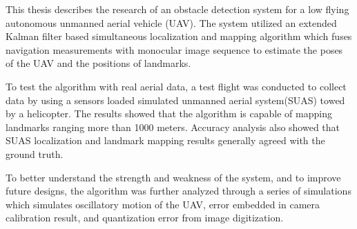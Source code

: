 
This thesis describes the research of an obstacle detection system for a low flying
autonomous unmanned aerial vehicle (UAV). The system utilized an
extended Kalman filter based simultaneous localization and mapping
algorithm which fuses navigation measurements with
monocular image sequence to estimate the poses of the UAV and the positions
of landmarks.

To test the algorithm with real aerial data, a test flight was conducted to
collect data by using a sensors loaded simulated unmanned aerial system(SUAS) towed
by a helicopter. 
The results showed that the algorithm is capable of mapping
landmarks ranging more than 1000 meters. Accuracy analysis also showed that SUAS localization and landmark mapping
results generally agreed with the ground truth. 

To better understand the strength and weakness of
the system, and to improve future designs, the
algorithm was further analyzed through a series of simulations which simulates oscillatory motion of the UAV, error embedded in camera calibration result, and quantization error from image digitization.
